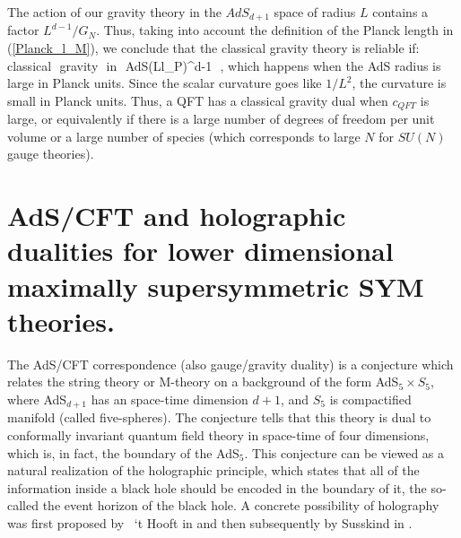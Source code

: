 The action of our gravity theory in the $AdS_{d+1}$ space of radius $L$ contains a factor $ L^{d-1}/G_N$. 
Thus, taking into account the definition of the Planck length in (\ref{Planck_l_M}), we conclude that the classical  gravity theory is reliable if:
\beq
{\rm classical\,\, gravity\,\, in\,\, AdS}\to \Big({L\over l_P}\Big)^{d-1} \,\,,
\eeq
which happens when the AdS radius is large in Planck units. Since the scalar curvature goes like $1/L^2$, the curvature
is small in Planck units. Thus, a QFT has a classical gravity dual when $c_{QFT}$ is large, or equivalently if there is a large 
number of degrees of freedom per unit volume or a large number of species (which corresponds to large $N$ for $SU(N)$ gauge theories). 



\section{\label{sec-ads}AdS/CFT and holographic dualities for lower dimensional maximally supersymmetric SYM theories.}

The AdS/CFT correspondence (also gauge/gravity duality) is a conjecture which relates
the string theory or M-theory on a background of the form 
AdS$_{5} \times S_{5} $, where AdS$_{d+1}$ has an
space-time dimension $d+1$, and $S_{5}$ is compactified manifold 
(called five-spheres). The conjecture tells that this theory is dual to conformally invariant quantum field theory 
in space-time of four dimensions, which is, in fact, the boundary of the AdS$_{5}$. This conjecture can be
viewed as a natural realization of the holographic principle, which states that all of the information inside a black hole should 
be encoded in the boundary of it, the so-called the event horizon of the black hole. A concrete possibility of holography was first 
proposed by ~`t Hooft in \cite{tHooft:1993dmi} and then subsequently by Susskind in \cite{Susskind:1994vu}.

